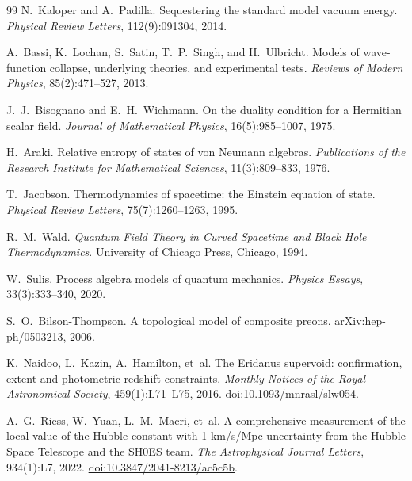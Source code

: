 \documentclass[11pt,a4paper]{article}
\theoremstyle{plain}
\theoremstyle{definition}
\theoremstyle{remark}
\begin{document}
\begin{thebibliography}{99}
N.~Kaloper and A.~Padilla.
\newblock Sequestering the standard model vacuum energy.
\newblock \textit{Physical Review Letters}, 112(9):091304, 2014.

A.~Bassi, K.~Lochan, S.~Satin, T.~P.~Singh, and H.~Ulbricht.
\newblock Models of wave-function collapse, underlying theories, and
  experimental tests.
\newblock \textit{Reviews of Modern Physics}, 85(2):471--527, 2013.

J.~J.~Bisognano and E.~H.~Wichmann.
\newblock On the duality condition for a Hermitian scalar field.
\newblock \textit{Journal of Mathematical Physics}, 16(5):985--1007, 1975.

H.~Araki.
\newblock Relative entropy of states of von {Neumann} algebras.
\newblock \textit{Publications of the Research Institute for Mathematical
  Sciences}, 11(3):809--833, 1976.

T.~Jacobson.
\newblock Thermodynamics of spacetime: the {Einstein} equation of state.
\newblock \textit{Physical Review Letters}, 75(7):1260--1263, 1995.

R.~M.~Wald.
\newblock \textit{Quantum Field Theory in Curved Spacetime and Black Hole
  Thermodynamics}.
\newblock University of Chicago Press, Chicago, 1994.

W.~Sulis.
\newblock Process algebra models of quantum mechanics.
\newblock \textit{Physics Essays}, 33(3):333--340, 2020.

S.~O.~Bilson-Thompson.
\newblock A topological model of composite preons.
\newblock arXiv:hep-ph/0503213, 2006.

K.~Naidoo, L.~Kazin, A.~Hamilton, et~al.
\newblock The Eridanus supervoid: confirmation, extent and photometric redshift
  constraints.
\newblock \emph{Monthly Notices of the Royal Astronomical Society},
  459(1):L71--L75, 2016.
\newblock \href{https://doi.org/10.1093/mnrasl/slw054}{doi:10.1093/mnrasl/slw054}.

A.~G.~Riess, W.~Yuan, L.~M.~Macri, et~al.
\newblock A comprehensive measurement of the local value of the Hubble constant
  with 1 km/s/Mpc uncertainty from the Hubble Space Telescope and the
  {SH0ES} team.
\newblock \emph{The Astrophysical Journal Letters}, 934(1):L7, 2022.
\newblock \href{https://doi.org/10.3847/2041-8213/ac5c5b}{doi:10.3847/2041-8213/ac5c5b}.


\end{thebibliography}
\end{document}
